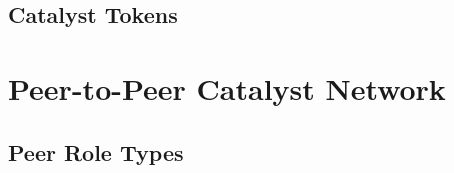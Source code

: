 \documentclass[a4paper, 12pt]{book}
\begin{document}


\section{Catalyst Tokens}\label{Sec:Tok}






\chapter{Peer-to-Peer Catalyst Network} \label{Cha:NAPI}

\section{Peer Role Types}\label{Sec:PRT}

\end{document}
